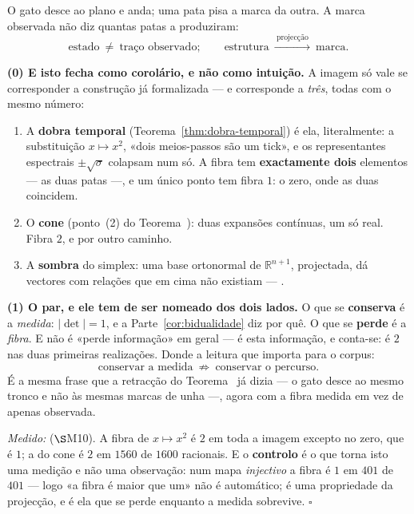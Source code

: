 \documentclass[livro.tex]{subfiles}
\begin{document}
\begin{corolario}\label{cor:pata}
O gato desce ao plano e anda; uma pata pisa a marca da outra. A marca
observada não diz quantas patas a produziram:
\[
\boxed{\;\text{estado}\ \neq\ \text{traço observado};
\qquad
\text{estrutura}\ \xrightarrow{\ \text{projecção}\ }\ \text{marca}.\;}
\]

\textbf{(0) E isto fecha como corolário, e não como intuição.} A imagem
só vale se corresponder a construção já formalizada --- e corresponde a
\emph{três}, todas com o mesmo número:
\begin{enumerate}
\item A \textbf{dobra temporal} (Teorema~\ref{thm:dobra-temporal}) é ela,
literalmente: a substituição $x\mapsto x^{2}$, «dois meios-passos são um
tick», e os representantes espectrais $\pm\sqrt{\sigma}$ colapsam num só.
A fibra tem \textbf{exactamente dois} elementos --- as duas patas ---, e
um único ponto tem fibra $1$: o zero, onde as duas coincidem.
\item O \textbf{cone} (ponto~(2) do Teorema~): duas
expansões contínuas, um só real. Fibra $2$, e por outro caminho.
\item A \textbf{sombra} do simplex: uma base ortonormal de
$\mathbb{R}^{n+1}$, projectada, dá vectores com relações que em cima não
existiam --- .
\end{enumerate}

\textbf{(1) O par, e ele tem de ser nomeado dos dois lados.} O que se
\textbf{conserva} é a \emph{medida}: $|\det|=1$, e a
Parte~\ref{cor:bidualidade} diz por quê. O que se \textbf{perde} é a
\emph{fibra}. E não é «perde informação» em geral --- é esta informação,
e conta-se: é $2$ nas duas primeiras realizações. Donde a leitura que
importa para o corpus:
\[
\boxed{\;\text{conservar a medida}\ \not\Rightarrow\ \text{conservar o
percurso}.\;}
\]
É a mesma frase que a retracção do Teorema~ já dizia --- o
gato desce ao mesmo tronco e não às mesmas marcas de unha ---, agora com
a fibra medida em vez de apenas observada.

\emph{Medido:}  ($\S$M10). A fibra de
$x\mapsto x^{2}$ é $2$ em toda a imagem excepto no zero, que é $1$; a do
cone é $2$ em $1560$ de $1600$ racionais. E o \textbf{controlo} é o que
torna isto uma medição e não uma observação: num mapa \emph{injectivo} a
fibra é $1$ em $401$ de $401$ --- logo «a fibra é maior que um» não é
automático; é uma propriedade da projecção, e é ela que se perde
enquanto a medida sobrevive. $\square$
\end{corolario}
\end{document}
